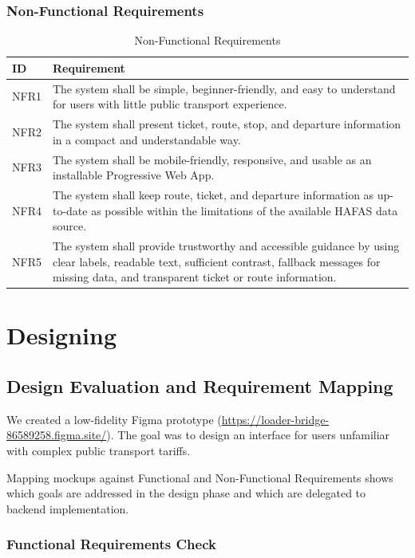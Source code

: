 \documentclass[12pt,a4paper]{article}
\begin{document}
\subsubsection{Non-Functional Requirements}

\begin{table}[h]
\centering
\begin{tabular}{|p{2cm}|p{12cm}|}
\hline
\textbf{ID} & \textbf{Requirement} \\
\hline
NFR1 & The system shall be simple, beginner-friendly, and easy to understand for users with little public transport experience. \\
\hline
NFR2 & The system shall present ticket, route, stop, and departure information in a compact and understandable way. \\
\hline
NFR3 & The system shall be mobile-friendly, responsive, and usable as an installable Progressive Web App. \\
\hline
NFR4 & The system shall keep route, ticket, and departure information as up-to-date as possible within the limitations of the available HAFAS data source. \\
\hline
NFR5 & The system shall provide trustworthy and accessible guidance by using clear labels, readable text, sufficient contrast, fallback messages for missing data, and transparent ticket or route information. \\
\hline
\end{tabular}
\caption{Non-Functional Requirements}
\label{tab:non-functional-requirements}
\end{table}


\section{Designing}
\subsection{Design Evaluation and Requirement Mapping}

We created a low-fidelity Figma prototype (\url{https://loader-bridge-86589258.figma.site/}). The goal was to design an interface for users unfamiliar with complex public transport tariffs.

Mapping mockups against Functional and Non-Functional Requirements shows which goals are addressed in the design phase and which are delegated to backend implementation.

\subsubsection{Functional Requirements Check}
\end{document}

